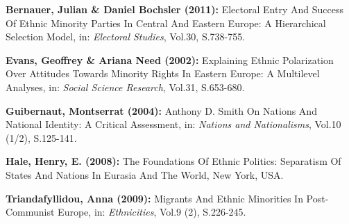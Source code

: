 \begin{compactitem}





\begin{small}


	\item [\Rectsteel] \textbf{Bernauer, Julian \& Daniel Bochsler (2011):} Electoral Entry And Success Of Ethnic Minority Parties In Central And Eastern Europe: A Hierarchical Selection Model, in: \textsl{Electoral Studies}, Vol.30, S.738-755.


	\item [\Rectsteel] \textbf{Evans, Geoffrey \& Ariana Need (2002):} Explaining Ethnic Polarization Over Attitudes Towards Minority Rights In Eastern Europe: A Multilevel Analyses, in: \textsl{Social Science Research}, Vol.31, S.653-680.


	\item [\Rectsteel] \textbf{Guibernaut, Montserrat (2004):} Anthony D. Smith On Nations And National Identity: A Critical Assessment, in: \textsl{Nations and Nationalisms}, Vol.10 (1/2), S.125-141.


	\item [\Rectsteel] \textbf{Hale, Henry, E. (2008):} The Foundations Of Ethnic Politics: Separatism Of States And Nations In Eurasia And The World, New York, USA.

	\item [\Rectsteel] \textbf{Triandafyllidou, Anna (2009):} Migrants And Ethnic Minorities In Post-Communist Europe, in: \textsl{Ethnicities}, Vol.9 (2), S.226-245.


\end{small}



	\end{compactitem}
